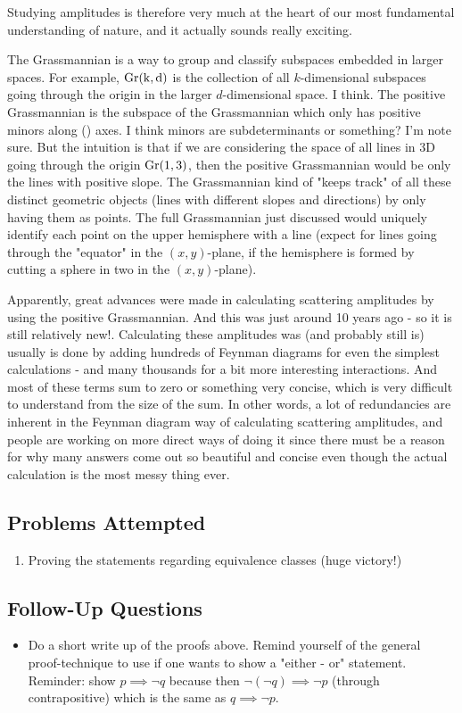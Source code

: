 Studying amplitudes is therefore very much at the heart of our most fundamental understanding of nature, and it actually sounds really exciting.

The Grassmannian is a way to group and classify subspaces embedded in larger spaces. For example, \(\rm{Gr}(k, d)\) is the collection of all \(k\)-dimensional subspaces going through the origin in the larger \(d\)-dimensional space. I think. The positive Grassmannian is the subspace of the Grassmannian which only has positive minors along () axes. I think minors are subdeterminants or something? I'm note sure. But the intuition is that if we are considering the space of all lines in 3D going through the origin \(\rm{Gr}(1, 3)\), then the positive Grassmannian would be only the lines with positive slope. The Grassmannian kind of "keeps track" of all these distinct geometric objects (lines with different slopes and directions) by only having them as points. The full Grassmannian just discussed would uniquely identify each point on the upper hemisphere with a line (expect for lines going through the "equator" in the \((x, y)\)-plane, if the hemisphere is formed by cutting a sphere in two in the \((x,y)\)-plane).

Apparently, great advances were made in calculating scattering amplitudes by using the positive Grassmannian. And this was just around 10 years ago - so it is still relatively new!. Calculating these amplitudes was (and probably still is) usually is done by adding hundreds of Feynman diagrams for even the simplest calculations - and many thousands for a bit more interesting interactions. And most of these terms sum to zero or something very concise, which is very difficult to understand from the size of the sum. In other words, a lot of redundancies are inherent in the Feynman diagram way of calculating scattering amplitudes, and people are working on more direct ways of doing it since there must be a reason for why many answers come out so beautiful and concise even though the actual calculation is the most messy thing ever.

\subsection*{Problems Attempted}
\begin{enumerate}
    \item Proving the statements regarding equivalence classes (huge victory!)
\end{enumerate}

\subsection*{Follow-Up Questions}
\begin{itemize}
    \item Do a short write up of the proofs above. Remind yourself of the general proof-technique to use if one wants to show a "either - or" statement. Reminder: show \(p \implies \neg q\) because then \(\neg(\neg q) \implies \neg p\) (through contrapositive) which is the same as \(q \implies \neg p\). 
\end{itemize}
